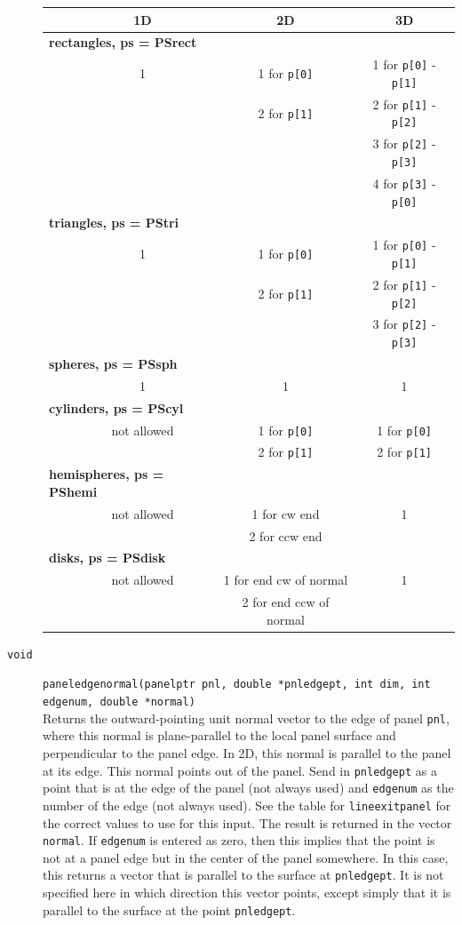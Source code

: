 \documentclass {scrbook}
\newcommand {\ttt} {\texttt}
\begin{document}
\begin{description}
\begin{longtable}[c]{lccc}
&1D&2D&3D\\
\hline
\multicolumn{2}{l}{\textbf{rectangles, ps = PSrect}}\\
&1&1 for \ttt{p[0]}&1 for \ttt{p[0]} - \ttt{p[1]}\\
&&2 for \ttt{p[1]}&2 for \ttt{p[1]} - \ttt{p[2]}\\
&&&3 for \ttt{p[2]} - \ttt{p[3]}\\
&&&4 for \ttt{p[3]} - \ttt{p[0]}\\
\hline
\multicolumn{2}{l}{\textbf{triangles, ps = PStri}}\\
&1&1 for \ttt{p[0]}&1 for \ttt{p[0]} - \ttt{p[1]}\\
&&2 for \ttt{p[1]}&2 for \ttt{p[1]} - \ttt{p[2]}\\
&&&3 for \ttt{p[2]} - \ttt{p[3]}\\
\hline
\multicolumn{2}{l}{\textbf{spheres, ps = PSsph}}\\
&1&1&1\\
\hline
\multicolumn{2}{l}{\textbf{cylinders, ps = PScyl}}\\
&not allowed&1 for \ttt{p[0]}&1 for \ttt{p[0]}\\
&&2 for \ttt{p[1]}&2 for \ttt{p[1]}\\
\hline
\multicolumn{2}{l}{\textbf{hemispheres, ps = PShemi}}\\
&not allowed&1 for cw end&1\\
&&2 for ccw end\\
\hline
\multicolumn{2}{l}{\textbf{disks, ps = PSdisk}}\\
&not allowed&1 for end cw of normal&1\\
&&2 for end ccw of normal\\
\end{longtable}

\item[\ttt{void}]
\ttt{paneledgenormal(panelptr pnl, double *pnledgept, int dim, int edgenum, double *normal)}
\hfill \\
Returns the outward-pointing unit normal vector to the edge of panel \ttt{pnl}, where this normal is plane-parallel to the local panel surface and perpendicular to the panel edge. In 2D, this normal is parallel to the panel at its edge. This normal points out of the panel. Send in \ttt{pnledgept} as a point that is at the edge of the panel (not always used) and \ttt{edgenum} as the number of the edge (not always used). See the table for \ttt{lineexitpanel} for the correct values to use for this input. The result is returned in the vector \ttt{normal}. If \ttt{edgenum} is entered as zero, then this implies that the point is not at a panel edge but in the center of the panel somewhere. In this case, this returns a vector that is parallel to the surface at \ttt{pnledgept}. It is not specified here in which direction this vector points, except simply that it is parallel to the surface at the point \ttt{pnledgept}.


\end{description}
\end{document}
